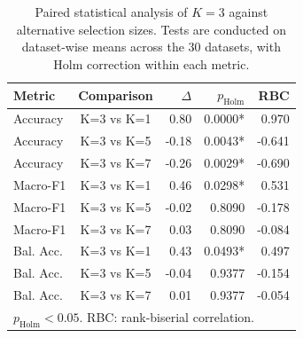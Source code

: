 \begin{table}[t]
\centering
\caption{Paired statistical analysis of $K=3$ against alternative selection sizes. Tests are conducted on dataset-wise means across the 30 datasets, with Holm correction within each metric.}
\label{tab:topk_stats}
\begin{tabular}{l|c|r|r|r}
\hline
Metric & Comparison & $\Delta$ & $p_{\mathrm{Holm}}$ & RBC\\
\hline
Accuracy & K=3 vs K=1 & 0.80 & 0.0000* & 0.970 \\
Accuracy & K=3 vs K=5 & -0.18 & 0.0043* & -0.641 \\
Accuracy & K=3 vs K=7 & -0.26 & 0.0029* & -0.690 \\
Macro-F1 & K=3 vs K=1 & 0.46 & 0.0298* & 0.531 \\
Macro-F1 & K=3 vs K=5 & -0.02 & 0.8090 & -0.178 \\
Macro-F1 & K=3 vs K=7 & 0.03 & 0.8090 & -0.084 \\
Bal. Acc. & K=3 vs K=1 & 0.43 & 0.0493* & 0.497 \\
Bal. Acc. & K=3 vs K=5 & -0.04 & 0.9377 & -0.154 \\
Bal. Acc. & K=3 vs K=7 & 0.01 & 0.9377 & -0.054 \\
\hline
\multicolumn{5}{l}{\footnotesize * $p_{\mathrm{Holm}}<0.05$. RBC: rank-biserial correlation.}\\
\end{tabular}
\end{table}
